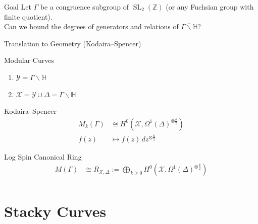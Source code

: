 \documentclass{beamer}
\theoremstyle{remark}
\newcommand\BH{{\mathbb H}}
\newcommand\BBZ{{\mathbb Z}}
\newcommand \sx{{\mathscr X}}
\newcommand \sy{{\mathscr Y}}
\newcommand{\SL}{\operatorname{SL}}
\begin{document}

\begin{frame}

\begin{block}{Goal}
Let $\Gamma$ be a congruence subgroup of $\SL_2(\BBZ)$ (or any Fuchsian group with finite quotient). \\
Can we bound the degrees of generators and relations of $\overline{\Gamma \backslash \mathbb{H}}$?
\end{block}

\end{frame}


\begin{frame}{Translation to Geometry (Kodaira--Spencer)}
\begin{block}{Modular Curves}
\begin{enumerate}
  \item $\sy = \Gamma \backslash \BH$
  \item $\sx = \sy \cup \Delta = \overline{\Gamma \backslash \BH}$
\end{enumerate}
\end{block}

\begin{block}{Kodaira--Spencer}
\begin{align*}
  M_k(\Gamma) &\cong H^0(\sx, \Omega^1(\Delta)^{\otimes \frac{k}{2}}) \\
	f(z) &\mapsto f(z)\, dz^{\otimes \frac{k}{2}}
\end{align*}
\end{block}

\begin{block}{Log Spin Canonical Ring}
\begin{align*}
  M(\Gamma) &\cong R_{\sx,\Delta} := \bigoplus_{k \geq 0} H^0(\sx, \Omega^1(\Delta)^{\otimes \frac{k}{2}}) \\
\end{align*}
\end{block}

\end{frame}

\section{Stacky Curves}
\end{document}
